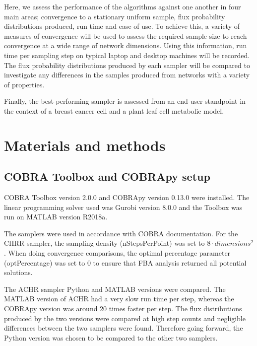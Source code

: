 \documentclass[10pt,letterpaper]{article}
\begin{document}
Here, we assess the performance of the algorithms against one another in four main areas; convergence to a stationary uniform sample, flux probability distributions produced, run time and ease of use. To achieve this, a variety of measures of convergence will be used to assess the required sample size to reach convergence at a wide range of network dimensions. Using this information, run time per sampling step on typical laptop and desktop machines will be recorded. The flux probability distributions produced by each sampler will be compared to investigate any differences in the samples produced from networks with a variety of properties. 

Finally, the best-performing sampler is assessed from an end-user standpoint in the context of a breast cancer cell and a plant leaf cell metabolic model.


\section*{Materials and methods}
\subsection*{COBRA Toolbox and COBRApy setup}
COBRA Toolbox version 2.0.0 and COBRApy version 0.13.0 were installed. The linear programming solver used was Gurobi version 8.0.0 and the Toolbox was run on MATLAB version R2018a. 

The samplers were used in accordance with COBRA documentation\cite{docUniform}. For the CHRR sampler, the sampling density (nStepsPerPoint) was set to $8 \cdot dimensions^{2}$. When doing convergence comparisons, the optimal percentage parameter (optPercentage) was set to 0 to ensure that FBA analysis returned all potential solutions.

The ACHR sampler Python and MATLAB versions were compared. The MATLAB version of ACHR had a very slow run time per step, whereas the COBRApy version was around 20 times faster per step. The flux distributions produced by the two versions were compared at high step counts and negligible differences between the two samplers were found. Therefore going forward, the Python version was chosen to be compared to the other two samplers. 
\end{document}
